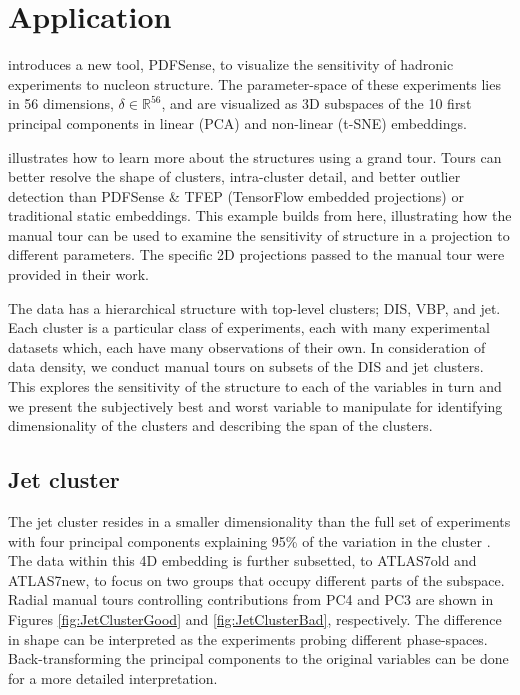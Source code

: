 \hypertarget{sec:application}{%
\section{Application}\label{sec:application}}

\citet{wang_mapping_2018} introduces a new tool, PDFSense, to visualize
the sensitivity of hadronic experiments to nucleon structure. The
parameter-space of these experiments lies in 56 dimensions,
\(\delta \in \mathbb{R}^{56}\), and are visualized as 3D subspaces of
the 10 first principal components in linear (PCA) and non-linear (t-SNE)
embeddings.

\citet{cook_dynamical_2018} illustrates how to learn more about the
structures using a grand tour. Tours can better resolve the shape of
clusters, intra-cluster detail, and better outlier detection than
PDFSense \& TFEP (TensorFlow embedded projections) or traditional static
embeddings. This example builds from here, illustrating how the manual
tour can be used to examine the sensitivity of structure in a projection
to different parameters. The specific 2D projections passed to the
manual tour were provided in their work.

The data has a hierarchical structure with top-level clusters; DIS, VBP,
and jet. Each cluster is a particular class of experiments, each with
many experimental datasets which, each have many observations of their
own. In consideration of data density, we conduct manual tours on
subsets of the DIS and jet clusters. This explores the sensitivity of
the structure to each of the variables in turn and we present the
subjectively best and worst variable to manipulate for identifying
dimensionality of the clusters and describing the span of the clusters.

\hypertarget{jet-cluster}{%
\subsection{Jet cluster}\label{jet-cluster}}

The jet cluster resides in a smaller dimensionality than the full set of
experiments with four principal components explaining 95\% of the
variation in the cluster \citep{cook_dynamical_2018}. The data within
this 4D embedding is further subsetted, to ATLAS7old and ATLAS7new, to
focus on two groups that occupy different parts of the subspace. Radial
manual tours controlling contributions from PC4 and PC3 are shown in
Figures \ref{fig:JetClusterGood} and \ref{fig:JetClusterBad},
respectively. The difference in shape can be interpreted as the
experiments probing different phase-spaces. Back-transforming the
principal components to the original variables can be done for a more
detailed interpretation.

